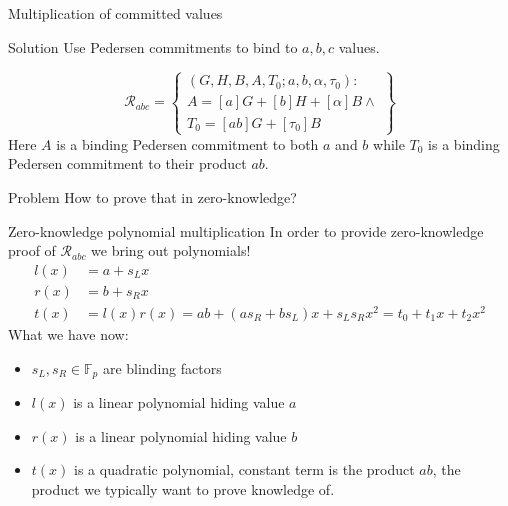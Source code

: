 \documentclass{zkdl-presentation-template}
\begin{document}
    \begin{frame}{Multiplication of committed values}
        \begin{block}{Solution}
            Use Pedersen commitments to bind to $a,b,c$ values.
        \end{block}
        \pause
        $$
            \mathcal{R}_{abc} = \left\{\begin{array}{l}
                (G,H,B,A,T_0; a,b, \alpha, \tau_0) : \\
                A = [a]G + [b]H + [\alpha]B \wedge \\
                T_0 = [ab]G + [\tau_0]B
            \end{array}\right\}
        $$
        Here $A$ is a binding Pedersen commitment to both $a$ and $b$ while $T_0$ is a binding Pedersen commitment to their product $ab$.
        \pause

        \begin{alertblock}{Problem}
            How to prove that in zero-knowledge?
        \end{alertblock}
    \end{frame}

    \begin{frame}{Zero-knowledge polynomial multiplication}
        In order to provide zero-knowledge proof of $\mathcal{R}_{abc}$ we bring out polynomials!
        \begin{align*}
            l(x) &= a + s_L x\\
            r(x) &= b + s_R x\\
            t(x) &= l(x)r(x) = ab + (as_R + bs_L)x + s_Ls_Rx^2 = t_0 + t_1x + t_2x^2
        \end{align*}
        \pause
        What we have now:
        \begin{itemize}
            \item $s_L, s_R \in \mathbb{F}_p$ are blinding factors\pause
            \item $l(x)$ is a linear polynomial hiding value $a$
            \item $r(x)$ is a linear polynomial hiding value $b$\pause
            \item $t(x)$ is a quadratic polynomial, constant term is the product $ab$, the product we typically want to prove knowledge of.
        \end{itemize}
    \end{frame}
\end{document}
